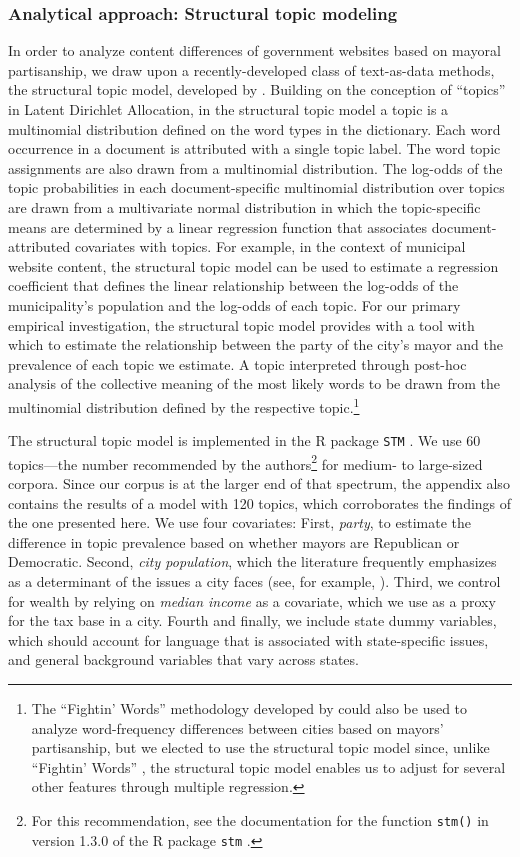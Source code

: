 \documentclass[11pt]{article}
\begin{document}
\subsubsection{Analytical approach: Structural topic modeling}
In order to analyze content differences of government websites based on mayoral partisanship, we draw upon a recently-developed class of text-as-data methods, the structural topic model, developed by \citet{Roberts2014}. Building on the conception of ``topics'' in Latent Dirichlet Allocation, in the structural topic model a topic is a multinomial distribution defined on the word types in the dictionary.  Each word occurrence in a document is attributed with a single topic label. The word topic assignments are also drawn from a multinomial distribution. The log-odds of the topic probabilities in each document-specific multinomial distribution over topics are drawn from a multivariate normal distribution in which the topic-specific means are determined by a linear regression function that associates document-attributed covariates with topics. For example, in the context of municipal website content, the structural topic model can be used to estimate a regression coefficient that defines the linear relationship between the log-odds of the municipality's population and the log-odds of each topic. For our primary empirical investigation, the structural topic model provides with a tool with which to estimate the relationship between the party of the city's mayor and the prevalence of each topic we estimate. A topic interpreted through post-hoc analysis of the collective meaning of the most likely words to be drawn from the multinomial distribution defined by the respective topic.\footnote{The ``Fightin' Words'' methodology developed by \citet{Monroe2008} could also be used to analyze word-frequency differences between cities based on mayors' partisanship, but we elected to use the structural topic model since, unlike ``Fightin' Words'' , the structural topic model enables us to adjust for several other features through multiple regression.}

The structural topic model is implemented in the R package \texttt{STM} \citep{stm}. We use 60 topics---the number recommended by the authors\footnote{For this recommendation, see the documentation for the function \texttt{stm()} in version 1.3.0 of the R package \texttt{stm} \citep{stm}.} for medium- to large-sized corpora. Since our corpus is at the larger end of that spectrum, the appendix also contains the results of a model with 120 topics, which corroborates the findings of the one presented here. We use four covariates: First, \textit{party}, to estimate the difference in topic prevalence based on whether mayors are Republican or Democratic. Second, \textit{city population}, which the literature frequently emphasizes as a determinant of the issues a city faces (see, for example, \cite{Guillamon2013}). Third, we control for wealth by relying on \textit{median income} as a covariate, which we use as a proxy for the tax base in a city. Fourth and finally, we include state dummy variables, which should account for language that is associated with state-specific issues, and general background variables that vary across states.
\end{document}
